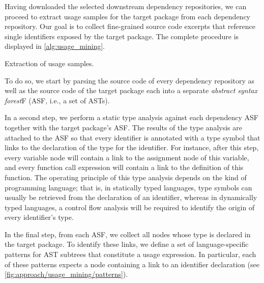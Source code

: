 Having downloaded the selected downstream dependency repositories, we can proceed to extract usage samples for the target package from each dependency repository.
Our goal is to collect fine-grained source code excerpts that reference single identifiers exposed by the target package.
The complete procedure is displayed in \cref{alg:usage_mining}.

\begin{algorithm}[b]
	\caption{Extraction of usage samples.}\label{alg:usage_mining}

	\;
\end{algorithm}

To do so, we start by parsing the source code of every dependency repository as well as the source code of the target package each into a separate \emph{abstract syntax forest}F (ASF, i.e., a set of ASTs).

In a second step, we perform a static type analysis against each dependency ASF together with the target package's ASF.
The results of the type analysis are attached to the ASF so that every identifier is annotated with a type symbol that links to the declaration of the type for the identifier.
For instance, after this step, every variable node will contain a link to the assignment node of this variable, and every function call expression will contain a link to the definition of this function.
The operating principle of this type analysis depends on the kind of programming language; that is, in statically typed languages, type symbols can usually be retrieved from the declaration of an identifier, whereas in dynamically typed languages, a control flow analysis will be required to identify the origin of every identifier's type.

In the final step, from each ASF, we collect all nodes whose type is declared in the target package.
To identify these links, we define a set of language-specific patterns for AST subtrees that constitute a usage expression.
In particular, each of these patterns expects a node containing a link to an identifier declaration (see \cref{fig:approach/usage_mining/patterns}).
